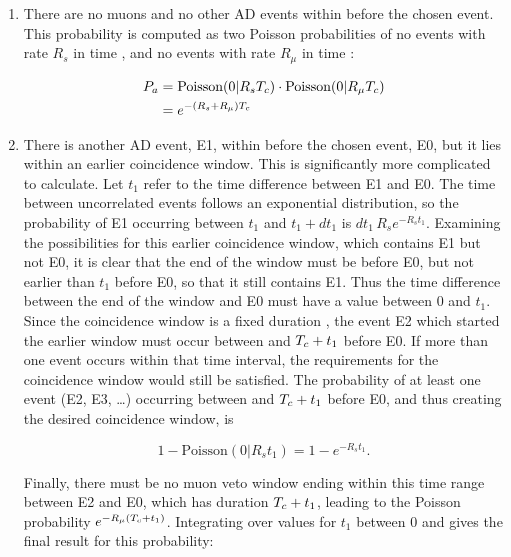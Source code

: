 \renewcommand{\labelenumi}{(\alph{enumi})}
\begin{enumerate}
    \item There are no muons and no other AD events
        within \tc{} before the chosen event.
        This probability is computed as two Poisson probabilities of
        no events with rate $R_s$ in time \tc,
        and no events with rate $R_\mu$ in time \tc:

        \begin{align*}
            P_a &= \text{Poisson}(0\vert R_sT_c)\cdot\text{Poisson}(0\vert R_\mu T_c) \\
                &= e^{-\left(R_s + R_\mu\right)T_c}
        \end{align*}

    \item There is another AD event, E1, within \tc{}
        before the chosen event, E0,
        but it lies within an earlier coincidence window.
        This is significantly more complicated to calculate.
        Let $t_1$ refer to the time difference between E1 and E0.
        The time between uncorrelated events follows an exponential distribution,
        so the probability of E1 occurring between $t_1$ and $t_1+dt_1$ is
        $dt_1\,R_se^{-R_st_1}$.
        Examining the possibilities for this earlier coincidence window,
        which contains E1 but not E0,
        it is clear that the end of the window must be before E0,
        but not earlier than $t_1$ before E0, so that it still contains E1.
        Thus the time difference between the end of the window and E0
        must have a value between 0 and $t_1$.
        Since the coincidence window is a fixed duration \tc{},
        the event E2 which started the earlier window must occur
        between \tc{} and $T_c + t_1$ before E0.
        If more than one event occurs within that time interval,
        the requirements for the coincidence window would still be satisfied.
        The probability of at least one event (E2, E3, \ldots) occurring
        between \tc{} and $T_c + t_1$ before E0,
        and thus creating the desired coincidence window, is

        \begin{equation*}
            1-\text{Poisson}(0\vert R_s t_1) = 1-e^{-R_st_1}.
        \end{equation*}

        Finally, there must be no muon veto window ending within this time range
        between E2 and E0, which has duration $T_c + t_1$,
        leading to the Poisson probability $e^{-R_\mu(T_c+t_1)}$.
        Integrating over values for $t_1$ between $0$ and \tc{}
        gives the final result for this probability:


\end{enumerate}
